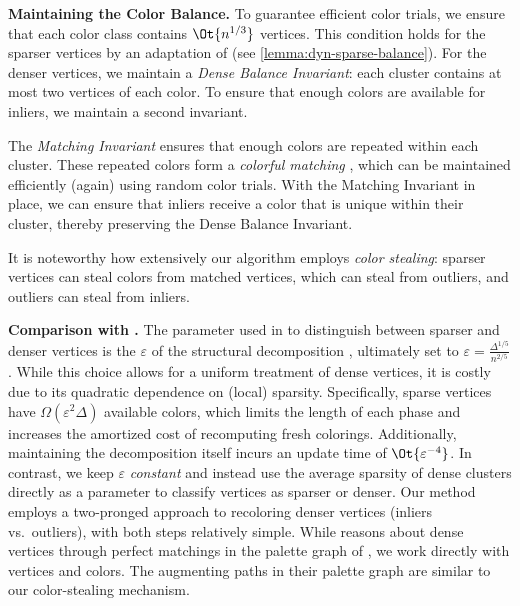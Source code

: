 \documentclass[a4paper,english,11pt]{amsart}
\renewcommand{\paragraph}[1]{\medskip\noindent\textbf{#1}}
\theoremstyle{definition}
\renewcommand{\epsilon}{\varepsilon}
\newcommand{\eps}{\varepsilon}
\begin{document}
\paragraph{Maintaining the Color Balance.}
To guarantee efficient color trials, we ensure that each color class contains $\Ot{ n^{1/3} }$ vertices. This condition holds for the sparser vertices by an adaptation of \cite{BRW24} (see \cref{lemma:dyn-sparse-balance}). For the denser vertices, we maintain a \emph{Dense Balance Invariant}: each cluster contains at most two vertices of each color. To ensure that enough colors are available for inliers, we maintain a second invariant.

The \emph{Matching Invariant} ensures that enough colors are repeated within each cluster. These repeated colors form a \emph{colorful matching} \cite{ACK19}, which can be maintained efficiently (again) using random color trials. With the Matching Invariant in place, we can ensure that inliers receive a color that is unique within their cluster, thereby preserving the Dense Balance Invariant.

It is noteworthy how extensively our algorithm employs \emph{color stealing}: sparser vertices can steal colors from matched vertices, which can steal from outliers, and outliers can steal from inliers.


\paragraph{Comparison with \cite{BRW24}.}
The parameter used in \cite{BRW24} to distinguish between sparser and denser vertices is the $\epsilon$ of the structural decomposition \cite{Reed98,HSS18}, ultimately set to $\eps = \frac{\Delta^{1/5}}{n^{2/5}}$.
While this choice allows for a uniform treatment of dense vertices, it is costly due to its quadratic dependence on (local) sparsity.
Specifically, sparse vertices have $\Omega(\epsilon^2 \Delta)$ available colors, which limits the length of each phase and increases the amortized cost of recomputing fresh colorings.
Additionally, maintaining the decomposition itself incurs an update time of $\Ot{\eps^{-4}}$.
In contrast, we keep $\eps$ \emph{constant} and instead use the average sparsity of dense clusters directly as a parameter to classify vertices as sparser or denser.
Our method employs a two-pronged approach to recoloring denser vertices (inliers vs.\ outliers), with both steps relatively simple.
While \cite{BRW24} reasons about dense vertices through perfect matchings in the palette graph of \cite{ACK19}, we work directly with vertices and colors.
The augmenting paths in their palette graph are similar to our color-stealing mechanism.
\end{document}
